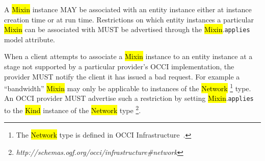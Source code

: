 \documentclass[10pt,a4paper]{article}
\begin{document}
A \hl{Mixin} instance MAY be associated with an entity instance
either at instance creation time or at run time.
Restrictions on which entity instances a particular \hl{Mixin} can be associated
with MUST be advertised through the \hl{Mixin}.{\tt applies} model attribute.

When a client attempts to associate a \hl{Mixin} instance to an entity instance
at a stage not supported by a particular provider's OCCI
implementation, the provider MUST notify the client it has issued a
bad request.
%
For example a ``bandwidth'' \hl{Mixin} may only
be applicable to instances of the \hl{Network}%
\footnote{The \hl{Network} type is defined in OCCI
  Infrastructure~\cite{occi:infrastructure}.}  type.
An OCCI provider MUST advertise such a restriction by setting
\hl{Mixin}.{\tt applies} to the \hl{Kind} instance of the \hl{Network} type%
\footnote{\textit{http://schemas.ogf.org/occi/infrastructure\#network}}.

\end{document}
